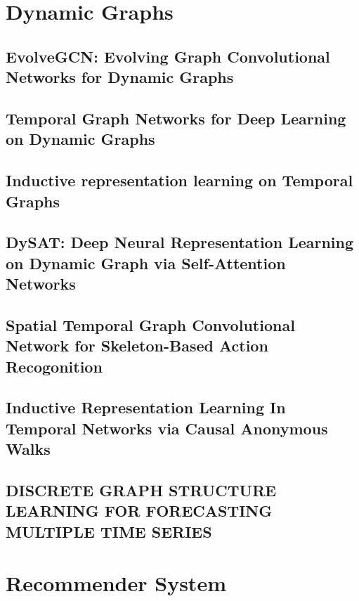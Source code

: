 \documentclass[a4paper,table]{article}
\begin{document}
\section{Dynamic Graphs}
\subsection{EvolveGCN: Evolving Graph Convolutional Networks for Dynamic Graphs}


\subsection{Temporal Graph Networks for Deep Learning on Dynamic Graphs}


\subsection{Inductive representation learning on Temporal Graphs}


\subsection{DySAT: Deep Neural Representation Learning on Dynamic Graph via Self-Attention Networks}


\subsection{Spatial Temporal Graph Convolutional Network for Skeleton-Based Action Recogonition}


\subsection{Inductive Representation Learning In  Temporal Networks via Causal Anonymous Walks}


\subsection{DISCRETE GRAPH STRUCTURE LEARNING FOR FORECASTING MULTIPLE TIME SERIES}


\section{Recommender System}
\end{document}
